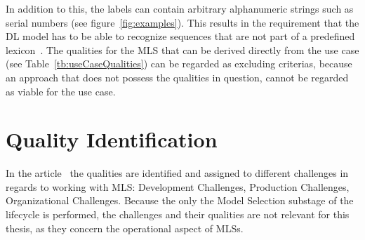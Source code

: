 In addition to this, the labels can contain arbitrary alphanumeric strings such as serial numbers
(see figure~\ref{fig:examples}).
This results in the requirement that the \ac{DL} model has to be able to recognize sequences that
are not part of a predefined lexicon~\citep{ghosh_visual_2017,chen_text_2021}.
The qualities for the \ac{MLS} that can be derived directly from the use case (see
Table~\ref{tb:useCaseQualities}) can be regarded as excluding criterias, because an approach
that does not possess the qualities in question, cannot be regarded as viable for the use case.

\section{Quality Identification}
In the article~\cite{ashmore_assuring_2021} the qualities are identified and assigned to different
challenges in regards to working with \ac{MLS}: Development Challenges, Production Challenges,
Organizational Challenges.
Because the only the Model Selection substage of the lifecycle is performed, the challenges and their
qualities are not relevant for this thesis, as they concern the operational aspect of \acp{MLS}.

